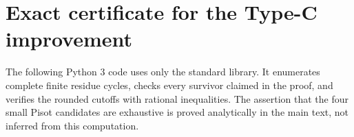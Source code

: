 \documentclass[11pt,a4paper]{article}
\theoremstyle{definition}
\theoremstyle{remark}
\numberwithin{equation}{section}
\begin{document}
\clearpage
{}

\section{Exact certificate for the Type-C improvement}
\label{f13:app:typec-code}
The following Python 3 code uses only the standard library. It enumerates
complete finite residue cycles, checks every survivor claimed in the
proof, and verifies the rounded cutoffs with rational inequalities.
The assertion that the four small Pisot candidates are exhaustive is
proved analytically in the main text, not inferred from this computation.
\begingroup
{}
\end{document}
